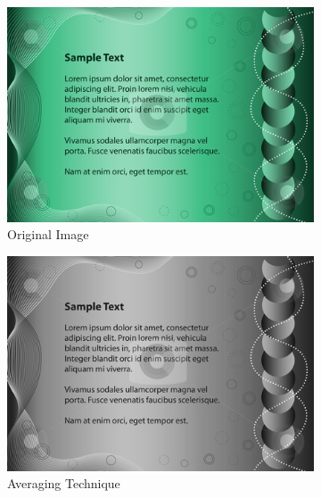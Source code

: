 \begin{figure}[t]
\hspace*{\fill} %
\begin{subfigure}{0.31\textwidth}
\includegraphics[width=\linewidth]{img/preprocessing/grayscale_orig.jpg}
\caption{Original Image} \label{fig:1a}
\end{subfigure}
\hspace*{\fill} %
\begin{subfigure}{0.31\textwidth}
\includegraphics[width=\linewidth]{img/preprocessing/grayscale_avg.png}
\caption{Averaging Technique} \label{fig:1b}
\end{subfigure}
\hspace*{\fill} %
\begin{subfigure}{0.31\textwidth}

\end{subfigure}
\end{figure}

